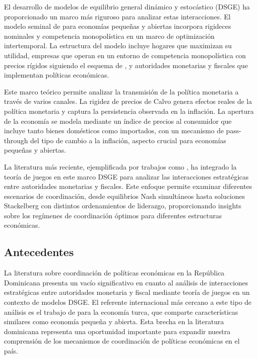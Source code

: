 \documentclass[
  authoryear,
  preprint]{elsarticle}
\begin{document}
El desarrollo de modelos de equilibrio general dinámico y estocástico
(DSGE) ha proporcionado un marco más riguroso para analizar estas
interacciones. El modelo seminal de \citep{gali_monetary_2005} para
economías pequeñas y abiertas incorpora rigideces nominales y
competencia monopolística en un marco de optimización intertemporal. La
estructura del modelo incluye hogares que maximizan su utilidad,
empresas que operan en un entorno de competencia monopolística con
precios rígidos siguiendo el esquema de \citep{calvo_staggered_1983}, y
autoridades monetarias y fiscales que implementan políticas económicas.

Este marco teórico permite analizar la transmisión de la política
monetaria a través de varios canales. La rigidez de precios de Calvo
genera efectos reales de la política monetaria y captura la persistencia
observada en la inflación. La apertura de la economía se modela mediante
un índice de precios al consumidor que incluye tanto bienes domésticos
como importados, con un mecanismo de pass-through del tipo de cambio a
la inflación, aspecto crucial para economías pequeñas y abiertas.

La literatura más reciente, ejemplificada por trabajos como
\citep{bartolomeo_fiscal-monetary_2005}, ha integrado la teoría de
juegos en este marco DSGE para analizar las interacciones estratégicas
entre autoridades monetarias y fiscales. Este enfoque permite examinar
diferentes escenarios de coordinación, desde equilibrios Nash
simultáneos hasta soluciones Stackelberg con distintos ordenamientos de
liderazgo, proporcionando insights sobre los regímenes de coordinación
óptimos para diferentes estructuras económicas.

\subsection{Antecedentes}\label{antecedentes}

La literatura sobre coordinación de políticas económicas en la República
Dominicana presenta un vacío significativo en cuanto al análisis de
interacciones estratégicas entre autoridades monetaria y fiscal mediante
teoría de juegos en un contexto de modelos DSGE. El referente
internacional más cercano a este tipo de análisis es el trabajo de
\citep{tetik_evaluation_2021} para la economía turca, que comparte
características similares como economía pequeña y abierta. Esta brecha
en la literatura dominicana representa una oportunidad importante para
expandir nuestra comprensión de los mecanismos de coordinación de
políticas económicas en el país.
\end{document}
